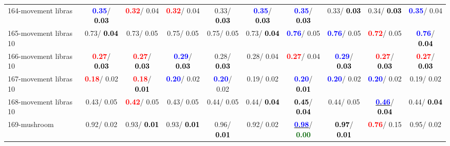 \begin{table}[h]
\begin{center}
{\begin{tabular}{lc|c|c|c|c|c|c|c|c}
164-movement libras & \textcolor{blue}{\textbf{  0.35}}/\textcolor{black}{\textbf{  0.03}} & \textcolor{red}{\textbf{  0.32}}/  0.04 & \textcolor{red}{\textbf{  0.32}}/  0.04 &   0.33/\textcolor{black}{\textbf{  0.03}} & \textcolor{blue}{\textbf{  0.35}}/\textcolor{black}{\textbf{  0.03}} & \textcolor{blue}{\textbf{  0.35}}/\textcolor{black}{\textbf{  0.03}} &   0.33/\textcolor{black}{\textbf{  0.03}} &   0.34/\textcolor{black}{\textbf{  0.03}} & \textcolor{blue}{\textbf{  0.35}}/  0.04 \\
165-movement libras 10 &   0.73/\textcolor{black}{\textbf{  0.04}} &   0.73/  0.05 &   0.75/  0.05 &   0.75/  0.05 &   0.73/\textcolor{black}{\textbf{  0.04}} & \textcolor{blue}{\textbf{  0.76}}/  0.05 & \textcolor{blue}{\textbf{  0.76}}/  0.05 & \textcolor{red}{\textbf{  0.72}}/  0.05 & \textcolor{blue}{\textbf{  0.76}}/\textcolor{black}{\textbf{  0.04}} \\
166-movement libras 10 & \textcolor{red}{\textbf{  0.27}}/\textcolor{black}{\textbf{  0.03}} & \textcolor{red}{\textbf{  0.27}}/\textcolor{black}{\textbf{  0.03}} & \textcolor{blue}{\textbf{  0.29}}/\textcolor{black}{\textbf{  0.03}} &   0.28/\textcolor{black}{\textbf{  0.03}} &   0.28/  0.04 & \textcolor{red}{\textbf{  0.27}}/  0.04 & \textcolor{blue}{\textbf{  0.29}}/\textcolor{black}{\textbf{  0.03}} & \textcolor{red}{\textbf{  0.27}}/\textcolor{black}{\textbf{  0.03}} & \textcolor{red}{\textbf{  0.27}}/\textcolor{black}{\textbf{  0.03}} \\
167-movement libras 10 & \textcolor{red}{\textbf{  0.18}}/  0.02 & \textcolor{red}{\textbf{  0.18}}/\textcolor{black}{\textbf{  0.01}} & \textcolor{blue}{\textbf{  0.20}}/  0.02 & \textcolor{blue}{\textbf{  0.20}}/  0.02 &   0.19/  0.02 & \textcolor{blue}{\textbf{  0.20}}/\textcolor{black}{\textbf{  0.01}} & \textcolor{blue}{\textbf{  0.20}}/  0.02 & \textcolor{blue}{\textbf{  0.20}}/  0.02 &   0.19/  0.02 \\ \hline
168-movement libras 10 &   0.43/  0.05 & \textcolor{red}{\textbf{  0.42}}/  0.05 &   0.43/  0.05 &   0.44/  0.05 &   0.44/\textcolor{black}{\textbf{  0.04}} & \textcolor{black}{\textbf{  0.45}}/\textcolor{black}{\textbf{  0.04}} &   0.44/  0.05 & \underline{\textcolor{blue}{\textbf{  0.46}}}/\textcolor{black}{\textbf{  0.04}} &   0.44/\textcolor{black}{\textbf{  0.04}} \\
169-mushroom &   0.92/  0.02 &   0.93/\textcolor{black}{\textbf{  0.01}} &   0.93/\textcolor{black}{\textbf{  0.01}} &   0.96/\textcolor{black}{\textbf{  0.01}} &   0.92/  0.02 & \underline{\textcolor{blue}{\textbf{  0.98}}}/\textcolor{darkgreen}{\textbf{  0.00}} & \textcolor{black}{\textbf{  0.97}}/\textcolor{black}{\textbf{  0.01}} & \textcolor{red}{\textbf{  0.76}}/  0.15 &   0.95/  0.02 \\

\end{tabular}}
\end{center}
\end{table}
